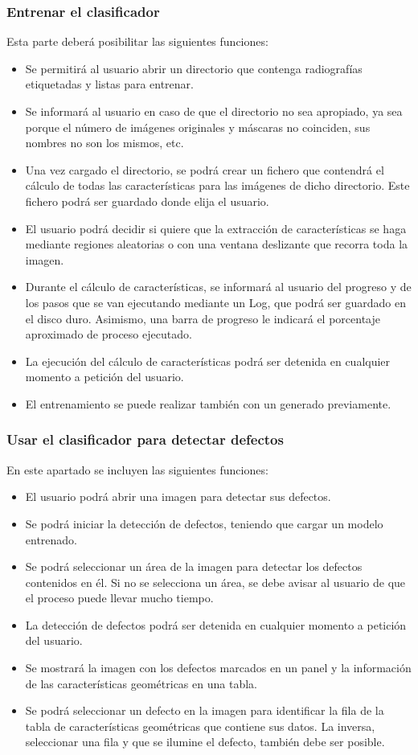\subsubsection{Entrenar el clasificador}
Esta parte deberá posibilitar las siguientes funciones:
\begin{itemize}
 \item Se permitirá al usuario abrir un directorio que contenga radiografías etiquetadas y listas para entrenar.
  \item Se informará al usuario en caso de que el directorio no sea apropiado, ya sea porque el número de imágenes originales y máscaras no coinciden, sus nombres no son los mismos, etc.
 \item Una vez cargado el directorio, se podrá crear un fichero \arff{} que contendrá el cálculo de todas las características para las imágenes de dicho directorio. Este fichero podrá ser guardado donde elija el usuario.
 \item El usuario podrá decidir si quiere que la extracción de características se haga mediante regiones aleatorias o con una ventana deslizante que recorra toda la imagen.
 \item Durante el cálculo de características, se informará al usuario del progreso y de los pasos que se van ejecutando mediante un Log, que podrá ser guardado en el disco duro. Asimismo, una barra de progreso le indicará el porcentaje aproximado de proceso ejecutado.
 \item La ejecución del cálculo de características podrá ser detenida en cualquier momento a petición del usuario.
 \item El entrenamiento se puede realizar también con un \arff{} generado previamente.
\end{itemize}


\subsubsection{Usar el clasificador para detectar defectos}
En este apartado se incluyen las siguientes funciones:
\begin{itemize}
 \item El usuario podrá abrir una imagen para detectar sus defectos.
 \item Se podrá iniciar la detección de defectos, teniendo que cargar un modelo entrenado.
 \item Se podrá seleccionar un área de la imagen para detectar los defectos contenidos en él. Si no se selecciona un área, se debe avisar al usuario de que el proceso puede llevar mucho tiempo.
 \item La detección de defectos podrá ser detenida en cualquier momento a petición del usuario.
 \item Se mostrará la imagen con los defectos marcados en un panel y la información de las características geométricas en una tabla.
 \item Se podrá seleccionar un defecto en la imagen para identificar la fila de la tabla de características geométricas que contiene sus datos. La inversa, seleccionar una fila y que se ilumine el defecto, también debe ser posible.
\end{itemize}

